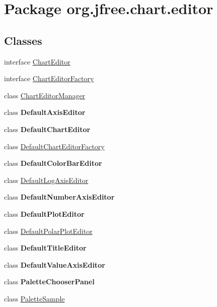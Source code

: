 \hypertarget{namespaceorg_1_1jfree_1_1chart_1_1editor}{}\section{Package org.\+jfree.\+chart.\+editor}
\label{namespaceorg_1_1jfree_1_1chart_1_1editor}
\subsection*{Classes}
\begin{DoxyCompactItemize}
\item 
interface \mbox{\hyperlink{interfaceorg_1_1jfree_1_1chart_1_1editor_1_1_chart_editor}{Chart\+Editor}}
\item 
interface \mbox{\hyperlink{interfaceorg_1_1jfree_1_1chart_1_1editor_1_1_chart_editor_factory}{Chart\+Editor\+Factory}}
\item 
class \mbox{\hyperlink{classorg_1_1jfree_1_1chart_1_1editor_1_1_chart_editor_manager}{Chart\+Editor\+Manager}}
\item 
class {\bfseries Default\+Axis\+Editor}
\item 
class {\bfseries Default\+Chart\+Editor}
\item 
class \mbox{\hyperlink{classorg_1_1jfree_1_1chart_1_1editor_1_1_default_chart_editor_factory}{Default\+Chart\+Editor\+Factory}}
\item 
class {\bfseries Default\+Color\+Bar\+Editor}
\item 
class \mbox{\hyperlink{classorg_1_1jfree_1_1chart_1_1editor_1_1_default_log_axis_editor}{Default\+Log\+Axis\+Editor}}
\item 
class {\bfseries Default\+Number\+Axis\+Editor}
\item 
class {\bfseries Default\+Plot\+Editor}
\item 
class \mbox{\hyperlink{classorg_1_1jfree_1_1chart_1_1editor_1_1_default_polar_plot_editor}{Default\+Polar\+Plot\+Editor}}
\item 
class {\bfseries Default\+Title\+Editor}
\item 
class {\bfseries Default\+Value\+Axis\+Editor}
\item 
class {\bfseries Palette\+Chooser\+Panel}
\item 
class \mbox{\hyperlink{classorg_1_1jfree_1_1chart_1_1editor_1_1_palette_sample}{Palette\+Sample}}
\end{DoxyCompactItemize}
